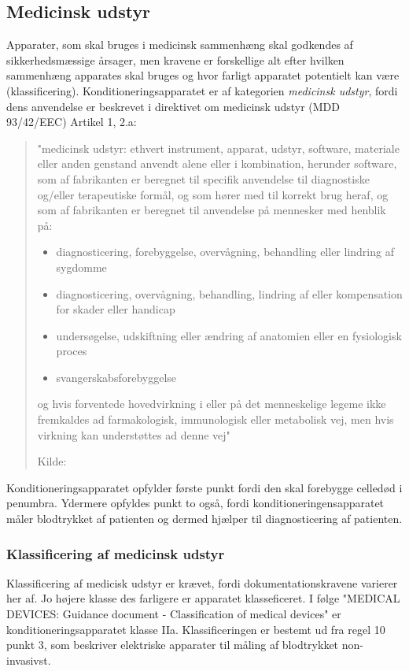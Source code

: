\subsection{Medicinsk udstyr}
Apparater, som skal bruges i medicinsk sammenhæng skal godkendes af sikkerhedsmæssige årsager, men kravene er forskellige alt efter hvilken sammenhæng apparates skal bruges og hvor farligt apparatet potentielt kan være (klassificering). Konditioneringsapparatet er af kategorien \textit{medicinsk udstyr}, fordi dens anvendelse er beskrevet i direktivet om medicinsk udstyr (MDD 93/42/EEC) Artikel 1, 2.a:

\begin{quote}
	"medicinsk udstyr: ethvert instrument, apparat, udstyr, software,
	materiale eller anden genstand anvendt alene eller i kombination,
	herunder software, som af fabrikanten er beregnet til specifik anvendelse
	til diagnostiske og/eller terapeutiske formål, og som hører med
	til korrekt brug heraf, og som af fabrikanten er beregnet til anvendelse
	på mennesker med henblik på:
	\begin{itemize}
		\item diagnosticering, forebyggelse, overvågning, behandling eller
		lindring af sygdomme
		\item diagnosticering, overvågning, behandling, lindring af eller
		kompensation for skader eller handicap
		\item undersøgelse, udskiftning eller ændring af anatomien eller en
		fysiologisk proces
		\item svangerskabsforebyggelse
	\end{itemize}
	
	og hvis forventede hovedvirkning i eller på det menneskelige
	legeme ikke fremkaldes ad farmakologisk, immunologisk eller metabolisk
	vej, men hvis virkning kan understøttes ad denne vej"
	
	Kilde:  
\end{quote}

Konditioneringsapparatet opfylder første punkt fordi den skal forebygge celledød i penumbra. Ydermere opfyldes punkt to også, fordi konditioneringensapparatet måler blodtrykket af patienten og dermed hjælper til diagnosticering af patienten.

\subsubsection{Klassificering af medicinsk udstyr}
Klassificering af medicisk udstyr er krævet, fordi dokumentationskravene varierer her af. Jo højere klasse des farligere er apparatet klasseficeret. I følge "MEDICAL DEVICES: Guidance document - Classification of medical devices" er konditioneringsapparatet klasse IIa. Klassificeringen er bestemt ud fra regel 10 punkt 3, som beskriver elektriske apparater til måling af blodtrykket non-invasivst.

